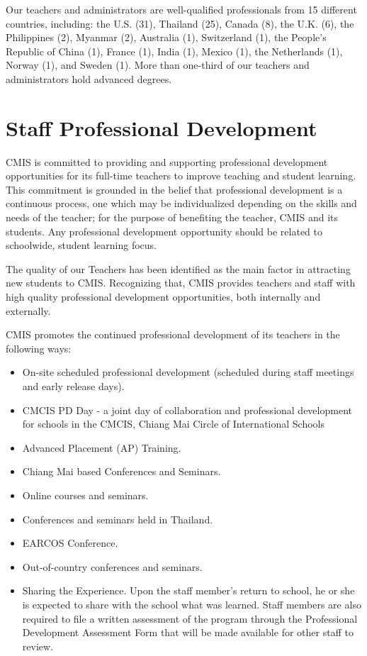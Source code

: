 Our teachers and administrators are well-qualified professionals from 15 different countries, including:  the U.S. (31), Thailand (25), Canada (8), the U.K. (6), the Philippines (2), Myanmar (2), Australia (1), Switzerland (1), the People’s Republic of China (1), France (1), India (1), Mexico (1), the Netherlands (1), Norway (1), and Sweden (1).  More than one-third of our teachers and administrators hold advanced degrees.


\section{Staff Professional Development}

CMIS is committed to providing and supporting professional development opportunities for its full-time teachers to improve teaching and student learning. This commitment is grounded in the belief that professional development is a continuous process, one which may be individualized depending on the skills and needs of the teacher; for the purpose of benefiting the teacher, CMIS and its students.  Any professional development opportunity should be related to schoolwide, student learning focus. 

The quality of our Teachers has been identified as the main factor in attracting new students to CMIS.  Recognizing that, CMIS provides teachers and staff with high quality professional development opportunities, both internally and externally.  

CMIS promotes the continued professional development of its teachers in the following ways:

\begin{itemize}
\item On-site scheduled professional development (scheduled during staff meetings and early release days).
\item CMCIS  PD Day - a joint day of collaboration and professional development for schools in the CMCIS, Chiang Mai Circle of International Schools
\item Advanced Placement (AP) Training.  
\item Chiang Mai based Conferences and Seminars. 
\item Online courses and seminars.  
\item Conferences and seminars held in Thailand. 
\item EARCOS Conference.
\item  Out-of-country conferences and seminars. 
\item Sharing the Experience.  Upon the staff member’s return to school, he or she is expected to share with the school what was learned.  Staff members are also required to file a written assessment of the program through the Professional Development Assessment Form that will be made available for other staff to review.
\end{itemize}


